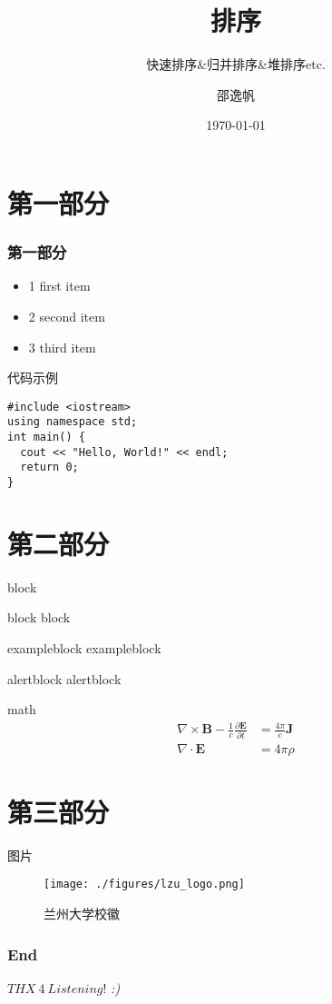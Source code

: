 \documentclass{ldr-simple-gray}
\title{排序}
\subtitle{快速排序\&归并排序\&堆排序etc.}
\author{邵逸帆}
\institute[] {
  23电信基地班\\
  兰州大学算法与程序设计集训队
}
\date{\today}
\begin{document}
  \frame{\titlepage} %

  \section{第一部分}
  \begin{frame}
    \frametitle{第一部分}
    \begin{itemize}
      \item 1 first item
      \item 2 second item
      \item 3 third item
    \end{itemize}
  \end{frame}

  \begin{frame}[fragile]{代码示例}
    \begin{verbatim}
#include <iostream>
using namespace std;
int main() {
  cout << "Hello, World!" << endl;
  return 0;
}
    \end{verbatim}
  \end{frame}

  \section{第二部分}
  \begin{frame}{block}
    \begin{block}{block}
      block
    \end{block}
    \begin{exampleblock}{exampleblock}
      exampleblock
    \end{exampleblock}
    \begin{alertblock}{alertblock}
      alertblock
    \end{alertblock}
  \end{frame}

  \begin{frame}{math}
    \begin{equation}
      \begin{aligned}
        \nabla \times \mathbf{B} - \frac{1}{c} \frac{\partial \mathbf{E}}{\partial t} &= \frac{4\pi}{c} \mathbf{J} \\
        \nabla \cdot \mathbf{E} &= 4\pi \rho
      \end{aligned}
    \end{equation}
  \end{frame}

  \section{第三部分}
  \begin{frame}{图片}
    \begin{figure}
      \centering
      \texttt{[image: ./figures/lzu\_logo.png]}
      \caption{兰州大学校徽}
    \end{figure}
  \end{frame}

  \begin{frame} %
    \frametitle{End}
    \begin{center}
      \Huge{$THX\ 4\ Listening!$}
      \emph{:)}
    \end{center}
  \end{frame}
\end{document}
